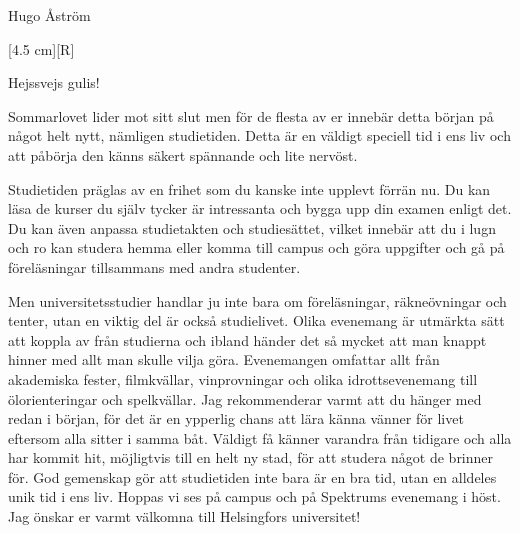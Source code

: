 \documentclass{spektraklet}
\begin{document}
\begin{ordforandespalten}{Hugo Åström}

[4.5 cm][R]

Hejssvejs gulis!

Sommarlovet lider mot sitt slut men för de flesta av er innebär detta början på något helt nytt, nämligen studietiden. Detta är en väldigt speciell tid i ens liv och att påbörja den känns säkert spännande och lite nervöst.

Studietiden präglas av en frihet som du kanske inte upplevt förrän nu. Du kan läsa de kurser du själv tycker är intressanta och bygga upp din examen enligt det. Du kan även anpassa studietakten och studiesättet, vilket  innebär att du i lugn och ro kan studera hemma eller komma till campus och göra uppgifter och gå på föreläsningar tillsammans med andra studenter.

Men universitetsstudier handlar ju inte bara om föreläsningar, räkneövningar och tenter, utan en viktig del är också studielivet. Olika evenemang är utmärkta sätt att koppla av från studierna och ibland händer det så mycket att man knappt hinner med allt man skulle vilja göra. Evenemangen omfattar allt från akademiska fester, filmkvällar,  vinprovningar och olika idrottsevenemang till  ölorienteringar och spelkvällar. Jag rekommenderar varmt att du hänger med redan i början, för det är en ypperlig chans att lära känna vänner för livet eftersom alla sitter i samma båt. Väldigt få känner varandra från tidigare och alla har kommit hit, möjligtvis till en helt ny stad, för att studera något de brinner för. God gemenskap gör att studietiden inte bara är en bra tid, utan en alldeles unik tid i ens liv. Hoppas vi ses på campus och på Spektrums evenemang i höst. Jag önskar er varmt välkomna till Helsingfors universitet!

\end{ordforandespalten}
\end{document}
